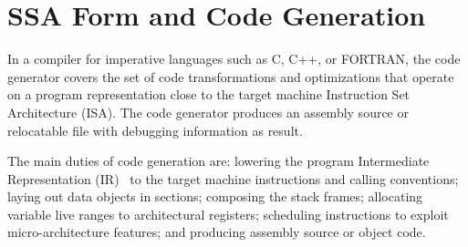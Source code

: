 \chapter{SSA Form and Code Generation }
\label{chapter:machine_dependent_optimization_codegen}

In a compiler for imperative languages such as C, C++, or FORTRAN, the code
generator covers the set of code transformations and optimizations that operate
on a program representation close to the target machine Instruction Set
Architecture (ISA). The code generator produces an
assembly source or relocatable file with debugging information as result.

The main duties of code generation are: lowering the program Intermediate
Representation (IR)~\cite{Stanier:2013:CS} to the target machine instructions and calling conventions;
laying out data objects in sections; composing the stack frames; allocating
variable live ranges to architectural registers; scheduling instructions to
exploit micro-architecture features; and producing assembly source or object code.

